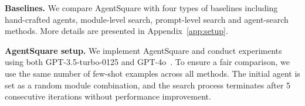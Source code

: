 \textbf{Baselines.}
We compare AgentSquare with four types of baselines including hand-crafted agents, module-level search, prompt-level search and agent-search methods. 
More details are presented in Appendix~\ref{app:setup}.

\textbf{AgentSquare setup.}
We implement AgentSquare and conduct experiments using both GPT-3.5-turbo-0125 and GPT-4o~\citep{achiam2023gpt}. To ensure a fair comparison, we use the same number of few-shot examples across all methods. The initial agent is set as a random module combination, and the search process terminates after 5 consecutive iterations without performance improvement.

